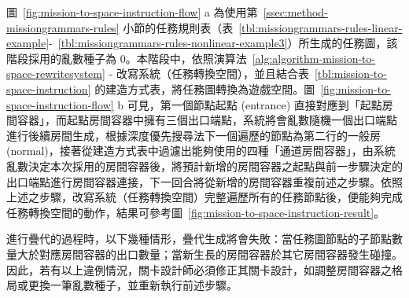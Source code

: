 圖~\ref{fig:mission-to-space-instruction-flow} a 為使用第~\ref{ssec:method-missiongrammars-rules} 小節的任務規則表（表~\ref{tbl:missiongrammars-rules-linear-example}-~\ref{tbl:missiongrammars-rules-nonlinear-example3}）所生成的任務圖，該階段採用的亂數種子為 $0$。本階段中，依照演算法~\ref{alg:algorithm-mission-to-space-rewritesystem} - 改寫系統（任務轉換空間），並且結合表~\ref{tbl:mission-to-space-instruction} 的建造方式表，將任務圖轉換為遊戲空間。圖~\ref{fig:mission-to-space-instruction-flow} b 可見，第一個節點起點 (entrance) 直接對應到「起點房間容器」，而起點房間容器中擁有三個出口端點，系統將會亂數隨機一個出口端點進行後續房間生成，根據深度優先搜尋法下一個遍歷的節點為第二行的一般房 (normal)，接著從建造方式表中過濾出能夠使用的四種「通道房間容器」，由系統亂數決定本次採用的房間容器後，將預計新增的房間容器之起點與前一步驟決定的出口端點進行房間容器連接，下一回合將從新增的房間容器重複前述之步驟。依照上述之步驟，改寫系統（任務轉換空間）完整遍歷所有的任務節點後，便能夠完成任務轉換空間的動作，結果可參考圖~\ref{fig:mission-to-space-instruction-result}。

進行疊代的過程時，以下幾種情形，疊代生成將會失敗：當任務圖節點的子節點數量大於對應房間容器的出口數量；當新生長的房間容器於其它房間容器發生碰撞。因此，若有以上違例情況，關卡設計師必須修正其關卡設計，如調整房間容器之格局或更換一筆亂數種子，並重新執行前述步驟。

